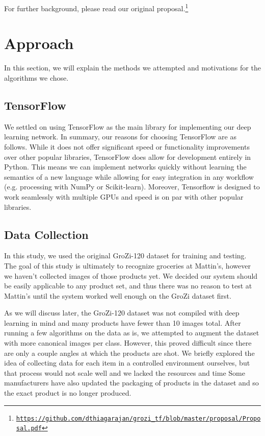 \documentclass[letterpaper, 11pt]{article}
\begin{document}
For further background, please read our original proposal.\footnote{\texttt{\href{https://github.com/dthiagarajan/grozi_tf/blob/master/proposal/Proposal.pdf}{https://github.com/dthiagarajan/grozi\_tf/blob/master/proposal/Proposal.pdf}}}

\section{Approach}


\noindent In this section, we will explain the methods we attempted and motivations for the algorithms we chose.

\subsection{TensorFlow}

We settled on using TensorFlow as the main library for implementing our deep learning network. In summary, our reasons for choosing TensorFlow are as follows. While it does not offer significant speed or functionality improvements over other popular libraries, TensorFlow does allow for development entirely in Python. This means we can implement networks quickly without learning the semantics of a new language while allowing for easy integration in any workflow (e.g. processing with NumPy or Scikit-learn). Moreover, Tensorflow is designed to work seamlessly with multiple GPUs and speed is on par with other popular libraries. \cite{lipton15}

\subsection{Data Collection}

In this study, we used the original GroZi-120 dataset for training and testing. The goal of this study is ultimately to recognize groceries at Mattin's, however we haven't collected images of those products yet. We decided our system should be easily applicable to any product set, and thus there was no reason to test at Mattin's until the system worked well enough on the GroZi dataset first.

As we will discuss later, the GroZi-120 dataset was not compiled with deep learning in mind and many products have fewer than 10 images total. After running a few algorithms on the data as is, we attempted to augment the dataset with more canonical images per class. However, this proved difficult since there are only a couple angles at which the products are shot. We briefly explored the idea of collecting data for each item in a controlled environment ourselves, but that process would not scale well and we lacked the resources and time \cite{DBLP:conf/aaai/SappSN08} Some manufacturers have also updated the packaging of products in the dataset and so the exact product is no longer produced.
\end{document}
